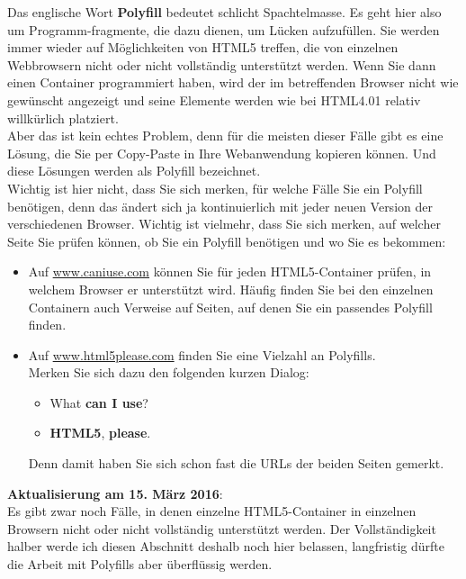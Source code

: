 Das englische Wort \textbf{Polyfill} bedeutet schlicht Spachtelmasse. Es geht hier also um Programm-fragmente, die dazu dienen, um Lücken aufzufüllen. Sie werden immer wieder auf Möglichkeiten von HTML5 treffen, die von einzelnen Webbrowsern nicht oder nicht vollständig unterstützt werden. Wenn Sie dann einen Container programmiert haben, wird der im betreffenden Browser nicht wie gewünscht angezeigt und seine Elemente werden wie bei HTML4.01 relativ willkürlich platziert.\\

Aber das ist kein echtes Problem, denn für die meisten dieser Fälle gibt es eine Lösung, die Sie per Copy-Paste in Ihre Webanwendung kopieren können. Und diese Lösungen werden als Polyfill bezeichnet.\\

Wichtig ist hier nicht, dass Sie sich merken, für welche Fälle Sie ein Polyfill benötigen, denn das ändert sich ja kontinuierlich mit jeder neuen Version der verschiedenen Browser. Wichtig ist vielmehr, dass Sie sich merken, auf welcher Seite Sie prüfen können, ob Sie ein Polyfill benötigen und wo Sie es bekommen:

\begin{itemize}
	\item Auf \url{www.caniuse.com} können Sie für jeden HTML5-Container prüfen, in welchem Browser er unterstützt wird. Häufig finden Sie bei den einzelnen Containern auch Verweise auf Seiten, auf denen Sie ein passendes Polyfill finden.
	\item Auf \url{www.html5please.com} finden Sie eine Vielzahl an Polyfills.\\
	Merken Sie sich dazu den folgenden kurzen Dialog: 
	\begin{itemize}
		\item What \textbf{can I use}?
		\item \textbf{HTML5}, \textbf{please}.
	\end{itemize}
	Denn damit haben Sie sich schon fast die URLs der beiden Seiten gemerkt.
\end{itemize}

\textbf{Aktualisierung am 15. März 2016}:\\

Es gibt zwar noch Fälle, in denen einzelne HTML5-Container in einzelnen Browsern nicht oder nicht vollständig unterstützt werden. Der Vollständigkeit halber werde ich diesen Abschnitt deshalb noch hier belassen, langfristig dürfte die Arbeit mit Polyfills aber überflüssig werden.\\

